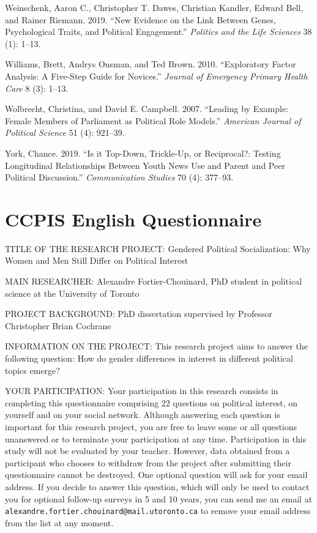 \documentclass[
  letterpaper,
  DIV=11,
  numbers=noendperiod]{scrreprt}
\newlength{\cslhangindent}
\newenvironment{CSLReferences}[2] %
 {\begin{list}{}{%
  \setlength{\itemindent}{0pt}
  \setlength{\leftmargin}{0pt}
  \setlength{\parsep}{0pt}
  \ifodd #1
   \setlength{\leftmargin}{\cslhangindent}
   \setlength{\itemindent}{-1\cslhangindent}
  \fi
  \setlength{\itemsep}{#2\baselineskip}}}
 {\end{list}}
\begin{document}
\begin{CSLReferences}{1}{0}
Weinschenk, Aaron C., Christopher T. Dawes, Christian Kandler, Edward
Bell, and Rainer Riemann. 2019. {``{New Evidence on the Link Between
Genes, Psychological Traits, and Political Engagement}.''}
\emph{Politics and the Life Sciences} 38 (1): 1--13.

Williams, Brett, Andrys Onsman, and Ted Brown. 2010. {``{Exploratory
Factor Analysis: A Five-Step Guide for Novices}.''} \emph{Journal of
Emergency Primary Health Care} 8 (3): 1--13.

Wolbrecht, Christina, and David E. Campbell. 2007. {``{Leading by
Example: Female Members of Parliament as Political Role Models}.''}
\emph{American Journal of Political Science} 51 (4): 921--39.

York, Chance. 2019. {``{Is it Top-Down, Trickle-Up, or Reciprocal?:
Testing Longitudinal Relationships Between Youth News Use and Parent and
Peer Political Discussion}.''} \emph{Communication Studies} 70 (4):
377--93.

\end{CSLReferences}

\cleardoublepage
{}
{}
\appendix

\chapter{CCPIS English Questionnaire}\label{sec-appendix1}

TITLE OF THE RESEARCH PROJECT: Gendered Political Socialization: Why
Women and Men Still Differ on Political Interest

MAIN RESEARCHER: Alexandre Fortier-Chouinard, PhD student in political
science at the University of Toronto

PROJECT BACKGROUND: PhD dissertation supervised by Professor Christopher
Brian Cochrane

INFORMATION ON THE PROJECT: This research project aims to answer the
following question: How do gender differences in interest in different
political topics emerge?

YOUR PARTICIPATION: Your participation in this research consists in
completing this questionnaire comprising 22 questions on political
interest, on yourself and on your social network. Although answering
each question is important for this research project, you are free to
leave some or all questions unanswered or to terminate your
participation at any time. Participation in this study will not be
evaluated by your teacher. However, data obtained from a participant who
chooses to withdraw from the project after submitting their
questionnaire cannot be destroyed. One optional question will ask for
your email address. If you decide to answer this question, which will
only be used to contact you for optional follow-up surveys in 5 and 10
years, you can send me an email at
\texttt{alexandre.fortier.chouinard@mail.utoronto.ca} to remove your
email address from the list at any moment.
\end{document}
